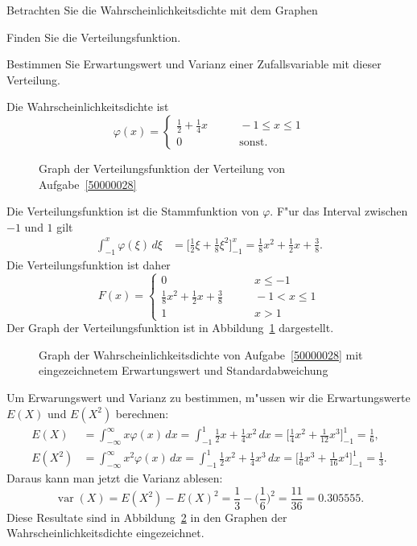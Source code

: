 Betrachten Sie die Wahrscheinlichkeitsdichte mit dem Graphen
\begin{center}
\end{center}
\begin{teilaufgaben}
\item Finden Sie die Verteilungsfunktion.
\item Bestimmen Sie Erwartungswert und Varianz einer Zufallsvariable
mit dieser Verteilung.
\end{teilaufgaben}

\begin{loesung}
Die Wahrscheinlichkeitsdichte ist 
\[
\varphi(x)=\begin{cases}
\frac12+\frac14x&\qquad -1\le x\le 1\\
0&\qquad\text{sonst.}
\end{cases}
\]
\begin{teilaufgaben}
\item
\begin{figure}
\centering
{}
\caption{Graph der Verteilungsfunktion der Verteilung von
Aufgabe~\ref{50000028}
\label{50000028:verteilungsfunktion}}
\end{figure}
Die Verteilungsfunktion ist die Stammfunktion von $\varphi$.
F"ur das Interval zwischen $-1$ und $1$ gilt
\begin{align*}
\int_{-1}^x\varphi(\xi)\,d\xi
&=
\biggl[\frac12 \xi+\frac18\xi^2\biggr]_{-1}^x
=
\frac18x^2+\frac12x+\frac{3}{8}.
\end{align*}
Die Verteilungsfunktion ist daher
\[
F(x)=\begin{cases}
0&\qquad x \le -1\\
\frac18x^2+\frac12x+\frac{3}{8}
&\qquad -1 < x\le 1\\
1&\qquad x >1
\end{cases}
\]
Der Graph der Verteilungsfunktion ist in
Abbildung~\ref{50000028:verteilungsfunktion} dargestellt.
\item
\begin{figure}
\centering
{}
\caption{Graph der Wahrscheinlichkeitsdichte von Aufgabe~\ref{50000028}
mit eingezeichnetem Erwartungswert und Standardabweichung
\label{50000028:varianz}}
\end{figure}
Um Erwarungswert und Varianz zu bestimmen, m"ussen wir die Erwartungswerte
$E(X)$ und $E(X^2)$ berechnen:
\begin{align*}
E(X)&=
\int_{-\infty}^\infty x\varphi(x)\,dx
=
\int_{-1}^{1}
\frac12x+\frac14x^2
\,dx
=
\biggl[
\frac14x^2+\frac1{12}x^3
\biggr]_{-1}^{1}
=\frac1{6},
\\
E(X^2)
&=
\int_{-\infty}^\infty x^2\varphi(x)\,dx
=
\int_{-1}^{1}
\frac12x^2+\frac14x^3
\,dx
=
\biggl[
\frac16x^3+\frac1{16}x^4
\biggr]_{-1}^{1}
=\frac1{3}.
\end{align*}
Daraus kann man jetzt die Varianz ablesen:
\[
\operatorname{var}(X) = E(X^2)-E(X)^2=\frac1{3}-\biggl(\frac1{6}\biggr)^2
=\frac{11}{36}=0.305555.
\]
Diese Resultate sind in Abbildung~\ref{50000028:varianz} in den Graphen
der Wahrscheinlichkeitsdichte eingezeichnet.
\end{teilaufgaben}
\end{loesung}

